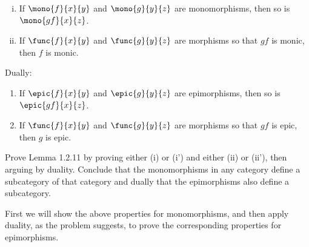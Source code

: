 \documentclass[main.tex]{subfiles}
\begin{document}
\begin{lemma}\leavevmode
	\begin{enumerate}[(i)]
		\item If \(\mono{f}{x}{y}\) and \(\mono{g}{y}{z}\) are monomorphisms,
			then so is \(\mono{gf}{x}{z}\).

		\item If \(\func{f}{x}{y}\) and \(\func{g}{y}{z}\) are morphisms so
			that \(gf\) is monic, then \(f\) is monic.
	\end{enumerate}
	Dually:
	\begin{enumerate}[(i')]
		\item If \(\epic{f}{x}{y}\) and \(\epic{g}{y}{z}\) are epimorphisms,
			then so is \(\epic{gf}{x}{z}\).

		\item If \(\func{f}{x}{y}\) and \(\func{g}{y}{z}\) are morphisms so
			that \(gf\) is epic, then \(g\) is epic.
	\end{enumerate}
\end{lemma}
\popthm

\begin{exercise}
	Prove Lemma 1.2.11 by proving either (i) or (i') and either (ii) or (ii'),
	then arguing by duality. Conclude that the monomorphisms in any category
	define a subcategory of that category and dually that the epimorphisms also
	define a subcategory.
\end{exercise}

First we will show the above properties for monomorphisms, and then apply
duality, as the problem suggests, to prove the corresponding properties for
epimorphisms.
\end{document}
